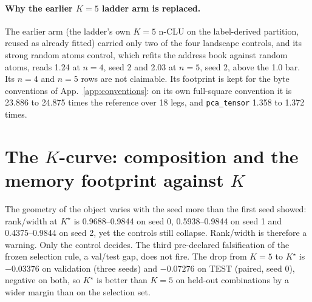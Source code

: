 \documentclass{article} %
\newcommand{\Kstar}{\ensuremath{K^{\star}}}
\begin{document}
\paragraph{Why the earlier $K=5$ ladder arm is replaced.} The earlier arm (the ladder's own
$K=5$ n-CLU on the label-derived partition, reused as already fitted) carried only two of the four
landscape controls, and its strong random atoms control, which refits the address book
against random atoms, reads 1.24 at $n=4$, seed 2 and 2.03 at $n=5$, seed 2, above the 1.0 bar. %
Its $n=4$ and $n=5$ rows are not claimable. Its footprint is kept for the byte conventions of
App.~\ref{app:conventions}: on its own full-square convention it is 23.886 to 24.875 times the %
reference over 18 legs, and \texttt{pca\_tensor} 1.358 to 1.372 times. %
\section{The $K$-curve: composition and the memory footprint against $K$}
\label{app:kcurve}

The geometry of the object varies with the seed more than the first seed showed:
rank/width at $\Kstar$ is 0.9688--0.9844 on seed 0, 0.5938--0.9844 on seed 1 and
0.4375--0.9844 on seed 2, yet the controls still collapse. Rank/width is therefore a warning.
Only the control decides. %
The third pre-declared falsification of the frozen selection rule, a val/test gap, does not fire.
The drop from $K=5$ to $\Kstar$ is $-0.03376$ on validation (three seeds) and $-0.07276$ on
TEST (paired, seed 0), negative on both, so $\Kstar$ is better than $K=5$ on held-out combinations
by a wider margin than on the selection set. %
\end{document}
